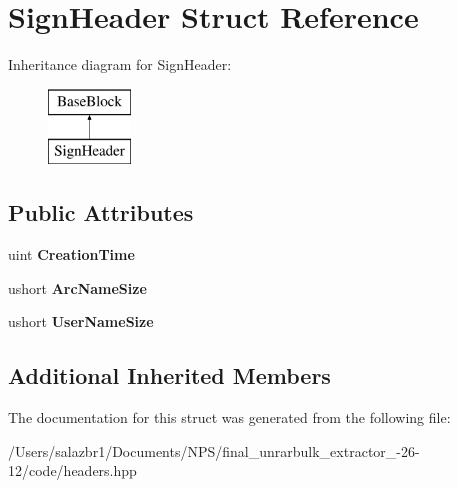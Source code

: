 \hypertarget{struct_sign_header}{\section{Sign\-Header Struct Reference}
\label{struct_sign_header}
}
Inheritance diagram for Sign\-Header\-:\begin{figure}[H]
\begin{center}
\leavevmode
\includegraphics[height=2.000000cm]{struct_sign_header}
\end{center}
\end{figure}
\subsection*{Public Attributes}
\begin{DoxyCompactItemize}
\item 
\hypertarget{struct_sign_header_a591ec518ab2984a380de1e4436f3b61e}{uint {\bfseries Creation\-Time}}\label{struct_sign_header_a591ec518ab2984a380de1e4436f3b61e}

\item 
\hypertarget{struct_sign_header_ac60ed4404304fe729e211a64bdea81c3}{ushort {\bfseries Arc\-Name\-Size}}\label{struct_sign_header_ac60ed4404304fe729e211a64bdea81c3}

\item 
\hypertarget{struct_sign_header_a9aa61d3242fcf619f16e76a3de963b09}{ushort {\bfseries User\-Name\-Size}}\label{struct_sign_header_a9aa61d3242fcf619f16e76a3de963b09}

\end{DoxyCompactItemize}
\subsection*{Additional Inherited Members}


The documentation for this struct was generated from the following file\-:\begin{DoxyCompactItemize}
\item 
/\-Users/salazbr1/\-Documents/\-N\-P\-S/final\-\_\-unrarbulk\-\_\-extractor\-\_-\/26-\/12/code/headers.\-hpp\end{DoxyCompactItemize}
